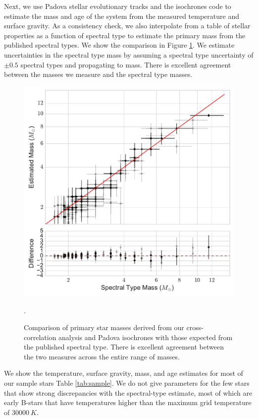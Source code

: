 \documentclass{emulateapj}
\begin{document}
Next, we use Padova stellar evolutionary tracks \citep{Bressan2012} and the isochrones code \citep{isochrones_code} to estimate the mass and age of the system from the measured temperature and surface gravity. As a consistency check, we also interpolate from a table of stellar properties as a function of spectral type \citep{Pecaut2013} to estimate the primary mass from the published spectral types. We show the comparison in Figure \ref{fig:prim_mass}. We estimate uncertainties in the spectral type mass by assuming a spectral type uncertainty of $\pm 0.5$ spectral types and propagating to mass. There is excellent agreement between the masses we measure and the spectral type masses.

\begin{figure}
\includegraphics[width=\columnwidth]{PrimaryMassEstimates_log.pdf}
\caption{Comparison of primary star masses derived from our cross-correlation analysis and Padova isochrones \citep{Bressan2012} with those expected from the published spectral type. There is excellent agreement between the two measures across the entire range of masses.}
\label{fig:prim_mass}.
\end{figure}

We show the temperature, surface gravity, mass, and age estimates for most of our sample stars Table \ref{tab:sample}. We do not give parameters for the few stars that show strong discrepancies with the spectral-type estimate, most of which are early B-stars that have temperatures higher than the maximum grid temperature of $30000\ K$. 
\end{document}
